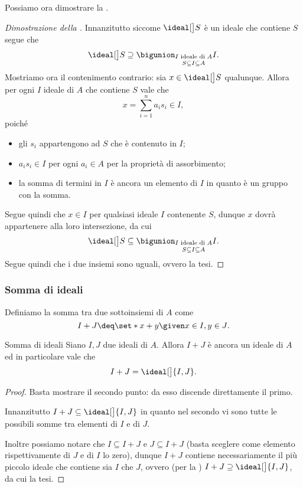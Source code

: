 Possiamo ora dimostrare la .
\begin{proof}
    [Dimostrazione della ]
    Innanzitutto siccome $\ideal[\big] S$ è un ideale che contiene $S$ segue che \[
        \ideal[\big] S \supseteq \bigunion_{\substack{I \text{ ideale di }A \\[2pt] S \subseteq I \subseteq A}} I. 
    \] Mostriamo ora il contenimento contrario: sia $x \in \ideal[\big] S$ qualunque. Allora per ogni $I$ ideale di $A$ che contiene $S$ vale che \[
        x = \sum_{i = 1}^n a_is_i \in I,
    \] poiché \begin{itemize}
        \item gli $s_i$ appartengono ad $S$ che è contenuto in $I$;
        \item $a_is_i \in I$ per ogni $a_i \in A$ per la proprietà di assorbimento;
        \item la somma di termini in $I$ è ancora un elemento di $I$ in quanto è un gruppo con la somma.
    \end{itemize} Segue quindi che $x \in I$ per qualsiasi ideale $I$ contenente $S$, dunque $x$ dovrà appartenere alla loro intersezione, da cui \[
        \ideal[\big] S \subseteq \bigunion_{\substack{I \text{ ideale di }A \\[2pt] S \subseteq I \subseteq A}} I. 
    \] Segue quindi che i due insiemi sono uguali, ovvero la tesi.
\end{proof}

\subsubsection{Somma di ideali}

Definiamo la somma tra due sottoinsiemi di $A$ come \[
    I + J \deq \set*{x + y \given x \in I, y \in J}.    
\]

\begin{proposition}{Somma di ideali}{}
    Siano $I, J$ due ideali di $A$. Allora $I+J$ è ancora un ideale di $A$ ed in particolare vale che \[
        I + J = \ideal[\big]{I, J}.    
    \]
\end{proposition}
\begin{proof}
    Basta mostrare il secondo punto: da esso discende direttamente il primo.

    Innanzitutto $I + J \subseteq \ideal[\big]{I, J}$ in quanto nel secondo vi sono tutte le possibili somme tra elementi di $I$ e di $J$. 
    
    Inoltre possiamo notare che $I \subseteq I + J$ e $J \subseteq I + J$ (basta sceglere come elemento rispettivamente di $J$ e di $I$ lo zero), dunque $I + J$ contiene necessariamente il più piccolo ideale che contiene sia $I$ che $J$, ovvero (per la ) $I+J \supseteq \ideal[\big]{I, J}$, da cui la tesi.
\end{proof}

